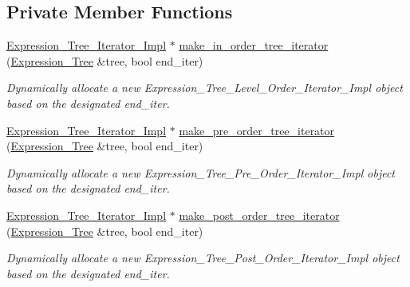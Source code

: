 \subsection*{Private Member Functions}
\begin{DoxyCompactItemize}
\item 
\hyperlink{classMadara_1_1Expression__Tree_1_1Expression__Tree__Iterator__Impl}{Expression\_\-Tree\_\-Iterator\_\-Impl} $\ast$ \hyperlink{classMadara_1_1Expression__Tree_1_1Expression__Tree__Iterator__Factory_a492806bade6071b13cfbff75e6a22f80}{make\_\-in\_\-order\_\-tree\_\-iterator} (\hyperlink{classMadara_1_1Expression__Tree_1_1Expression__Tree}{Expression\_\-Tree} \&tree, bool end\_\-iter)
\begin{DoxyCompactList}\small\item\em Dynamically allocate a new {\itshape Expression\_\-Tree\_\-Level\_\-Order\_\-Iterator\_\-Impl\/} object based on the designated {\itshape end\_\-iter\/}. \item\end{DoxyCompactList}\item 
\hyperlink{classMadara_1_1Expression__Tree_1_1Expression__Tree__Iterator__Impl}{Expression\_\-Tree\_\-Iterator\_\-Impl} $\ast$ \hyperlink{classMadara_1_1Expression__Tree_1_1Expression__Tree__Iterator__Factory_aa5a4c3c838077e00ca5da565802bf4c1}{make\_\-pre\_\-order\_\-tree\_\-iterator} (\hyperlink{classMadara_1_1Expression__Tree_1_1Expression__Tree}{Expression\_\-Tree} \&tree, bool end\_\-iter)
\begin{DoxyCompactList}\small\item\em Dynamically allocate a new {\itshape Expression\_\-Tree\_\-Pre\_\-Order\_\-Iterator\_\-Impl\/} object based on the designated {\itshape end\_\-iter\/}. \item\end{DoxyCompactList}\item 
\hyperlink{classMadara_1_1Expression__Tree_1_1Expression__Tree__Iterator__Impl}{Expression\_\-Tree\_\-Iterator\_\-Impl} $\ast$ \hyperlink{classMadara_1_1Expression__Tree_1_1Expression__Tree__Iterator__Factory_ad36db5c7397fd27e3292839b1d591325}{make\_\-post\_\-order\_\-tree\_\-iterator} (\hyperlink{classMadara_1_1Expression__Tree_1_1Expression__Tree}{Expression\_\-Tree} \&tree, bool end\_\-iter)
\begin{DoxyCompactList}\small\item\em Dynamically allocate a new {\itshape Expression\_\-Tree\_\-Post\_\-Order\_\-Iterator\_\-Impl\/} object based on the designated {\itshape end\_\-iter\/}. \item\end{DoxyCompactList}\item 

\end{DoxyCompactItemize}
